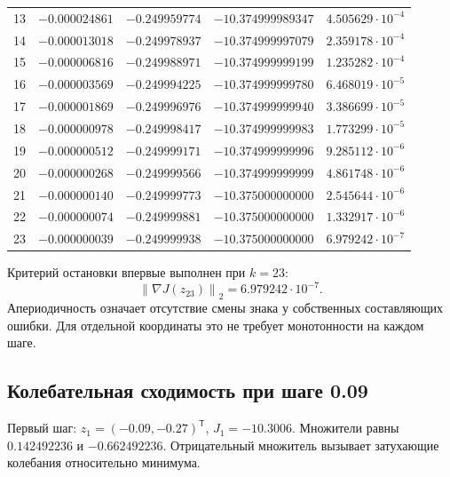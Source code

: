 \documentclass[12pt,a4paper]{article}
\newcommand{\norm}[1]{\left\lVert#1\right\rVert_2}
\begin{document}
\begin{center}
\begin{longtable}{r|r|r|r|r}
13 & $-0.000024861$ & $-0.249959774$ & $-10.374999989347$ & $4.505629\cdot10^{-4}$ \\
14 & $-0.000013018$ & $-0.249978937$ & $-10.374999997079$ & $2.359178\cdot10^{-4}$ \\
15 & $-0.000006816$ & $-0.249988971$ & $-10.374999999199$ & $1.235282\cdot10^{-4}$ \\
16 & $-0.000003569$ & $-0.249994225$ & $-10.374999999780$ & $6.468019\cdot10^{-5}$ \\
17 & $-0.000001869$ & $-0.249996976$ & $-10.374999999940$ & $3.386699\cdot10^{-5}$ \\
18 & $-0.000000978$ & $-0.249998417$ & $-10.374999999983$ & $1.773299\cdot10^{-5}$ \\
19 & $-0.000000512$ & $-0.249999171$ & $-10.374999999996$ & $9.285112\cdot10^{-6}$ \\
20 & $-0.000000268$ & $-0.249999566$ & $-10.374999999999$ & $4.861748\cdot10^{-6}$ \\
21 & $-0.000000140$ & $-0.249999773$ & $-10.375000000000$ & $2.545644\cdot10^{-6}$ \\
22 & $-0.000000074$ & $-0.249999881$ & $-10.375000000000$ & $1.332917\cdot10^{-6}$ \\
23 & $-0.000000039$ & $-0.249999938$ & $-10.375000000000$ & $6.979242\cdot10^{-7}$ \\
\hline\end{longtable}
\end{center}
Критерий остановки впервые выполнен при $k=23$:
\[
\norm{\nabla J(z_{23})}=6.979242\cdot10^{-7}.
\]
Апериодичность означает отсутствие смены знака у собственных составляющих ошибки.
Для отдельной координаты это не требует монотонности на каждом шаге.
\newpage

\subsection{Колебательная сходимость при шаге 0.09}
Первый шаг: $z_1=(-0.09,-0.27)^{\mathsf T}$, $J_1=-10.3006$.
Множители равны $0.142492236$ и $-0.662492236$. Отрицательный множитель
вызывает затухающие колебания относительно минимума.
\end{document}
